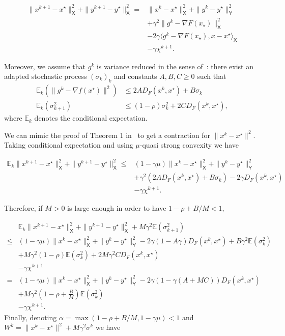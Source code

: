 \documentclass{article}
\newcommand{\bE}{{\mathbb E}}
\newcommand{\sX}{{\mathsf X}}
\newcommand{\sY}{{\mathsf Y}}
\newcommand{\ps}[1]{\langle #1 \rangle}
\theoremstyle{definition}
\begin{document}
\begin{align*}
    \|x^{k+1} - x^\star\|_\sX^2 + \|y^{k+1} - y^\star\|_\sX^2 
    =& \|x^k - x^\star\|_\sX^2 + \|y^k - y^\star\|_\sY^2 \\
    &+ \gamma^2 \|g^k - \nabla F(x_\star) \|_\sX^2\\
    &- 2\gamma\ps{g^k - \nabla F(x_\star),x-x^\star}_\sX\\
    &-\gamma \chi^{k+1}.
\end{align*}

Moreover, we assume that $g^k$ is variance reduced in the sense of~\cite{gorbunov2019unified}: there exist an adapted stochastic process $(\sigma_k)_k$ and constants $A,B,C \geq 0$ such that
\begin{align}
    \bE_k(\|g^k - \nabla f(x^\star)\|^2) &\leq 2AD_F(x^k,x^\star) + B\sigma_k\\
    \bE_k(\sigma_{k+1}^2) &\leq (1-\rho)\sigma_k^2 + 2CD_F(x^k,x^\star),
\end{align}
where $\bE_k$ denotes the conditional expectation.


We can mimic the proof of Theorem 1 in~\cite{gorbunov2019unified} to get a contraction for $\|x^k-x^\star\|^2$.
Taking conditional expectation and using $\mu$-quasi strong convexity we have

\begin{align*}
    \bE_k \|x^{k+1} - x^\star\|_\sX^2 + \|y^{k+1} - y^\star\|_\sX^2 
    \leq& (1-\gamma\mu)\|x^k - x^\star\|_\sX^2 + \|y^k - y^\star\|_\sY^2 \\
    &+ \gamma^2 (2AD_F(x^k,x^\star) + B\sigma_k) - 2\gamma D_F(x^k,x^\star)\\
    &-\gamma\chi^{k+1}.
\end{align*}

Therefore, if $M>0$ is large enough in order to have $1-\rho+B/M < 1$,

\begin{align*}
    &\bE_k \|x^{k+1} - x^\star\|_\sX^2 + \|y^{k+1} - y^\star\|_\sX^2 + M\gamma^2\bE(\sigma_{k+1}^2)\\
    \leq& (1-\gamma\mu)\|x^k - x^\star\|_\sX^2 + \|y^k - y^\star\|_\sY^2 -2\gamma(1-A\gamma)D_F(x^k,x^\star) + B\gamma^2\bE(\sigma_k^2)\\
     &+ M\gamma^2(1-\rho)\bE(\sigma_k^2)+ 2M\gamma^2CD_F(x^k,x^\star)\\
    &-\gamma\chi^{k+1}\\
    =& (1-\gamma\mu)\|x^k - x^\star\|_\sX^2 + \|y^k - y^\star\|_\sY^2 -2\gamma(1-\gamma(A+MC))D_F(x^k,x^\star)\\
     &+ M\gamma^2(1-\rho+\frac{B}{M})\bE(\sigma_k^2)\\
    &-\gamma\chi^{k+1}.
\end{align*}
Finally, denoting $\alpha = \max(1-\rho+B/M,1-\gamma\mu) < 1$ and $W^k = \|x^k-x^\star\|^2 + M\gamma^2\sigma^k$ we have
\end{document}
